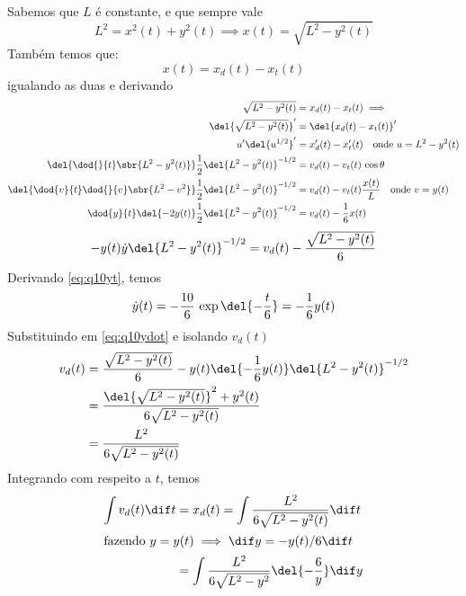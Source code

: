 \documentclass[]{IMTexam}
\begin{document}
\begin{questions}
\begin{solution}
		Sabemos que $ L $ é constante, e que sempre vale
		\[ L^{2}=x^{2}(t)+y^{2}(t)\implies x(t)=\sqrt{L^{2}-y^{2}(t)} \]
		Também temos que:
		\[ x(t)=x_d(t)-x_t(t) \]
		igualando as duas e derivando
		\begin{align*}
			\sqrt{L^{2}-y^{2}(t)}                                                             & =x_d(t)-x_t(t)\implies                               \\
			\del{\sqrt{L^{2}-y^{2}(t)}}'                                                      & =\del{x_d(t)-x_t(t)}'                                \\
			u'\del{u^{1/2}}'                                                                  & =x_d'(t)-x_t'(t)\quad\text{onde }u=L^{2}-y^{2}(t)    \\
			\del{\dod{}{t}\sbr{L^{2}-y^{2}(t)}}\dfrac{1}{2}\del{L^{2}-y^{2}(t)}^{-1/2}        & =v_d(t)-v_t(t)\,\cos\theta                           \\
			\del{\dod{v}{t}\dod{}{v}\sbr{L^{2}-v^{2}}}\dfrac{1}{2}\del{L^{2}-y^{2}(t)}^{-1/2} & =v_d(t)-v_t(t)\dfrac{x(t)}{L}\quad\text{onde }v=y(t) \\
			\dod{y}{t}\del{-2y(t)}\dfrac{1}{2}\del{L^{2}-y^{2}(t)}^{-1/2}                     & =v_d(t)-\dfrac{1}{6}x(t)
		\end{align*}
		\begin{equation}\label{eq:q10ydot}
			-y(t)\dot{y}\del{L^{2}-y^{2}(t)}^{-1/2}=v_d(t)-\dfrac{\sqrt{L^{2}-y^{2}(t)}}{6}
		\end{equation}
		Derivando \ref{eq:q10yt}, temos
		\[ \dot{y}(t)=-\dfrac{10}{6}\,\exp{\del{-\dfrac{t}{6}}}=-\dfrac{1}{6}y(t) \]
		Substituindo em \ref{eq:q10ydot} e isolando $ v_d(t) $
		\begin{align*}
			v_d(t) & =\dfrac{\sqrt{L^{2}-y^{2}(t)}}{6}-y(t)\del{-\dfrac{1}{6}y(t)}\del{L^{2}-y^{2}(t)}^{-1/2} \\
			       & =\dfrac{\del{\sqrt{L^{2}-y^{2}(t)}}^{2}+y^{2}(t)}{6\sqrt{L^{2}-y^{2}(t)}}                \\
			       & =\dfrac{L^{2}}{6\sqrt{L^{2}-y^{2}(t)}}
		\end{align*}
		Integrando com respeito a $ t $, temos
		\begin{align*}
			\int v_d(t)\dif t & =x_d(t)=\int\dfrac{L^{2}}{6\sqrt{L^{2}-y^{2}(t)}}\dif t                        \\
			\intertext{fazendo $ y=y(t)\implies\dif y=-y(t)/6 \dif t $}
			                  & =\int\dfrac{L^{2}}{6\sqrt{L^{2}-y^{2}}} \del{-\dfrac{6}{y}}\dif y              \\

\end{align*}
\end{solution}
\end{questions}
\end{document}
